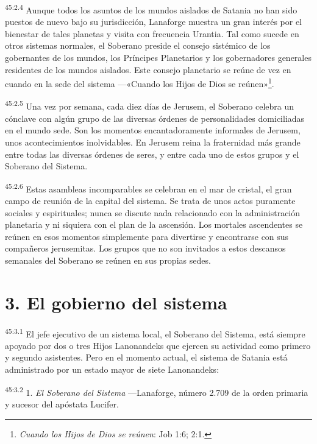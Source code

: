 \par
\textsuperscript{45:2.4} Aunque todos los asuntos de los mundos aislados de Satania no han sido puestos de nuevo bajo su jurisdicción, Lanaforge muestra un gran interés por el bienestar de tales planetas y visita con frecuencia Urantia. Tal como sucede en otros sistemas normales, el Soberano preside el consejo sistémico de los gobernantes de los mundos, los Príncipes Planetarios y los gobernadores generales residentes de los mundos aislados. Este consejo planetario se reúne de vez en cuando en la sede del sistema ---«Cuando los Hijos de Dios se reúnen»\footnote{\textit{Cuando los Hijos de Dios se reúnen}: Job 1:6; 2:1.}.

\par
\textsuperscript{45:2.5} Una vez por semana, cada diez días de Jerusem, el Soberano celebra un cónclave con algún grupo de las diversas órdenes de personalidades domiciliadas en el mundo sede. Son los momentos encantadoramente informales de Jerusem, unos acontecimientos inolvidables. En Jerusem reina la fraternidad más grande entre todas las diversas órdenes de seres, y entre cada uno de estos grupos y el Soberano del Sistema.

\par
\textsuperscript{45:2.6} Estas asambleas incomparables se celebran en el mar de cristal, el gran campo de reunión de la capital del sistema. Se trata de unos actos puramente sociales y espirituales; nunca se discute nada relacionado con la administración planetaria y ni siquiera con el plan de la ascensión. Los mortales ascendentes se reúnen en esos momentos simplemente para divertirse y encontrarse con sus compañeros jerusemitas. Los grupos que no son invitados a estos descansos semanales del Soberano se reúnen en sus propias sedes.

\section*{3. El gobierno del sistema}
\par
\textsuperscript{45:3.1} El jefe ejecutivo de un sistema local, el Soberano del Sistema, está siempre apoyado por dos o tres Hijos Lanonandeks que ejercen su actividad como primero y segundo asistentes. Pero en el momento actual, el sistema de Satania está administrado por un estado mayor de siete Lanonandeks:

\par
\textsuperscript{45:3.2} 1. \textit{El Soberano del Sistema} ---Lanaforge, número 2.709 de la orden primaria y sucesor del apóstata Lucifer.

